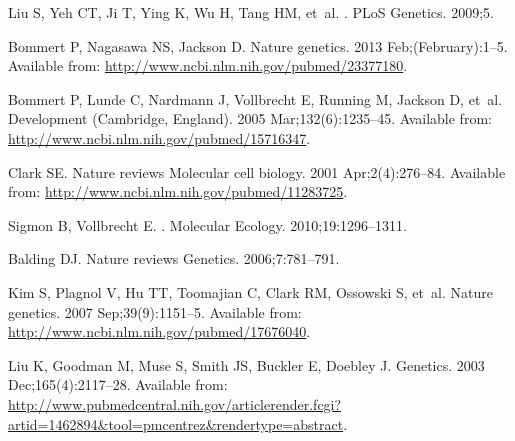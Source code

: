 \documentclass[10pt,letterpaper]{article}
\begin{document}
\begin{thebibliography}{}
Liu S, Yeh CT, Ji T, Ying K, Wu H, Tang HM, et~al.
.
\newblock PLoS Genetics. 2009;5.

Bommert P, Nagasawa NS, Jackson D.
\newblock Nature genetics. 2013 Feb;(February):1--5.
\newblock Available from: \url{http://www.ncbi.nlm.nih.gov/pubmed/23377180}.

Bommert P, Lunde C, Nardmann J, Vollbrecht E, Running M, Jackson D, et~al.
\newblock Development (Cambridge, England). 2005 Mar;132(6):1235--45.
\newblock Available from: \url{http://www.ncbi.nlm.nih.gov/pubmed/15716347}.

Clark SE.
\newblock Nature reviews Molecular cell biology. 2001 Apr;2(4):276--84.
\newblock Available from: \url{http://www.ncbi.nlm.nih.gov/pubmed/11283725}.

Sigmon B, Vollbrecht E.
.
\newblock Molecular Ecology. 2010;19:1296--1311.

Balding DJ.
\newblock Nature reviews Genetics. 2006;7:781--791.

Kim S, Plagnol V, Hu TT, Toomajian C, Clark RM, Ossowski S, et~al.
\newblock Nature genetics. 2007 Sep;39(9):1151--5.
\newblock Available from: \url{http://www.ncbi.nlm.nih.gov/pubmed/17676040}.

Liu K, Goodman M, Muse S, Smith JS, Buckler E, Doebley J.
\newblock Genetics. 2003 Dec;165(4):2117--28.
\newblock Available from:
  \url{http://www.pubmedcentral.nih.gov/articlerender.fcgi?artid=1462894\&tool=pmcentrez\&rendertype=abstract}.

\end{thebibliography}
\end{document}
